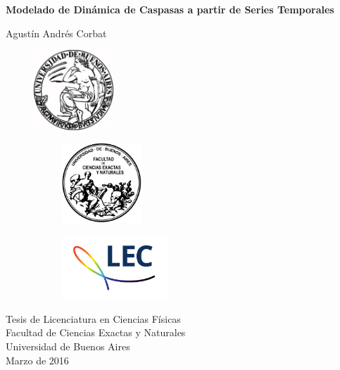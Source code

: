 \thispagestyle{empty}



\begin{center}


 
\textbf{\Huge Modelado de Dinámica de Caspasas a partir de Series Temporales}

\vspace{2.5cm}

{\LARGE Agustín Andrés Corbat}

\vfill

\begin{figure}[H]
\centering
\includegraphics[width=3cm]{./img/logos/uba.jpg}
\end{figure}

\vspace{1cm}

\begin{figure}[H]
    \centering
    \begin{subfigure}{0.49\textwidth}
        \centering
        \includegraphics[width=3cm]{./img/logos/Logo-fcenuba.png}
    \end{subfigure}
    \begin{subfigure}{0.49\textwidth}
        \centering
        \includegraphics[width=4cm]{./img/logos/logo_lec_letras.pdf}
    \end{subfigure}
\end{figure}

\vspace{1cm}

{\Large Tesis de Licenciatura en Ciencias Físicas\\
Facultad de Ciencias Exactas y Naturales\\
Universidad de Buenos Aires\\[2cm]
Marzo de 2016}

\end{center}


